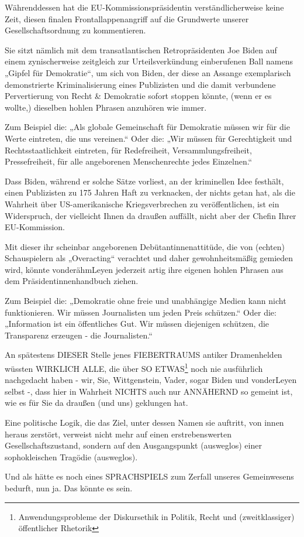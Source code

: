 \begin{multicols}{2}
Währenddessen hat die EU-Kommissionspräsidentin
verständlicherweise keine Zeit, diesen finalen Frontallappenangriff auf die Grundwerte unserer Gesellschaftsordnung zu kommentieren.

Sie sitzt nämlich mit dem transatlantischen Retropräsidenten Joe Biden auf einem zynischerweise zeitgleich
zur Urteilsverkündung einberufenen Ball namens „Gipfel für Demokratie“, um sich von Biden, der diese an
Assange exemplarisch demonstrierte Kriminalisierung
eines Publizisten und die damit verbundene Pervertierung von Recht \& Demokratie sofort stoppen könnte,
(wenn er es wollte,) dieselben hohlen Phrasen anzuhören wie immer.

Zum Beispiel die: „Als globale Gemeinschaft für Demokratie müssen wir für die Werte eintreten, die uns vereinen.“ Oder die: „Wir müssen für Gerechtigkeit und
Rechtsstaatlichkeit eintreten, für Redefreiheit, Versammlungsfreiheit, Pressefreiheit, für alle angeborenen Menschenrechte jedes Einzelnen.“

Dass Biden, während er solche Sätze vorliest, an der kriminellen Idee festhält, einen Publizisten zu 175 Jahren
Haft zu verknacken, der nichts getan hat, als die Wahrheit über US-amerikanische Kriegsverbrechen zu veröffentlichen, ist ein Widerspruch, der vielleicht Ihnen da
draußen auffällt, nicht aber der Chefin Ihrer EU-Kommission.

Mit dieser ihr scheinbar angeborenen Debütantinnenattitüde, die von (echten) Schauspielern als „Overacting“
verachtet und daher gewohnheitsmäßig gemieden wird,
könnte vonderähmLeyen jederzeit artig ihre eigenen
hohlen Phrasen aus dem Präsidentinnenhandbuch ziehen.

Zum Beispiel die: „Demokratie ohne freie und unabhängige Medien kann nicht funktionieren. Wir müssen Journalisten um jeden Preis schützen.“ Oder die: „Information
ist ein öffentliches Gut. Wir müssen diejenigen schützen,
die Transparenz erzeugen - die Journalisten.“

An spätestens DIESER Stelle jenes FIEBERTRAUMS antiker Dramenhelden wüssten WIRKLICH ALLE, die über
SO ETWAS\footnote[37]{Anwendungsprobleme der Diskursethik in Politik, Recht und (zweitklassiger) öffentlicher Rhetorik} noch nie ausführlich nachgedacht haben
- wir, Sie, Wittgenstein, Vader, sogar Biden und vonderLeyen selbst -, dass hier in Wahrheit NICHTS auch nur
ANNÄHERND so gemeint ist, wie es für Sie da draußen
(und uns) geklungen hat.

Eine politische Logik, die das Ziel, unter dessen Namen
sie auftritt, von innen heraus zerstört, verweist nicht
mehr auf einen erstrebenswerten Gesellschaftszustand,
sondern auf den Ausgangspunkt (ausweglos) einer sophokleischen Tragödie (ausweglos).

Und als hätte es noch eines SPRACHSPIELS zum Zerfall
unseres Gemeinwesens bedurft, nun ja. Das könnte es
sein.




\end{multicols}

